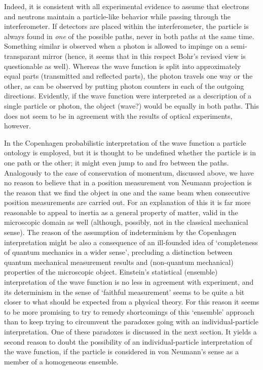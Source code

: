 \documentclass[12pt]{article}
\begin{document}
Indeed, it is consistent with all experimental evidence to assume
that electrons and neutrons maintain a particle-like behavior
while passing through the interferometer. If detectors
are placed within the interferometer, the particle is always found
in {\em one} of the possible paths, never in both paths at the
same time. Something similar is observed when a photon is allowed
to impinge on a semi-transparant mirror (hence, it seems that in
this respect Bohr's revised view is questionable as well). Whereas
the wave function is split into approximately equal parts
(transmitted and reflected parts), the photon travels one way or
the other, as can be observed by putting photon counters in each
of the outgoing directions. Evidently, if the wave function were
interpreted as a description of a single particle or photon, the
object (wave?) would be equally in both paths. This does not seem
to be in agreement with the results of optical experiments,
however.

In the Copenhagen probabilistic interpretation of the wave
function a particle ontology is employed, but it is thought to be
undefined whether the particle is in one path or the other; it
might even jump to and fro between the paths. Analogously to the
case of conservation of momentum, discussed above, we have no
reason to believe that in a position measurement von Neumann
projection is the reason that we find the object in one and the
same beam when consecutive position measurements are carried out.
For an explanation of this it is far more reasonable to appeal to
inertia as a general property of matter, valid in the microscopic
domain as well (although, possibly, not in the classical
mechanical sense). The reason of the assumption of indeterminism
by the Copenhagen interpretation might be also a consequence of an
ill-founded idea of `completeness of quantum mechanics in a wider
sense', precluding a distinction between quantum mechanical
measurement results and (non-quantum mechanical) properties of the
microscopic object. Einstein's statistical (ensemble)
interpretation of the wave function is no less in agreement with
experiment, and its determinism in the sense of `faithful
measurement' seems to be quite a bit closer to what should be
expected from a physical theory. For this reason it seems to be
more promising to try to remedy shortcomings of this `ensemble'
approach than to keep trying to circumvent the paradoxes going
with an individual-particle interpretation. One of these paradoxes
is discussed in the next section. It yields a second reason to
doubt the possibility of an individual-particle interpretation of
the wave function, if the particle is considered in von Neumann's
sense as a member of a homogeneous ensemble.
\end{document}
